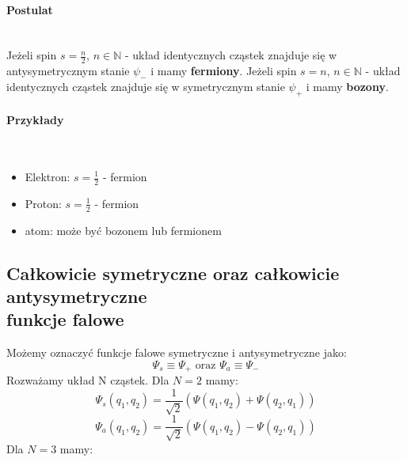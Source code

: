 \paragraph*{Postulat}\mbox{}\\
%
Jeżeli spin $s = \frac{n}{2}$, $n \in \mathbb{N}$ - układ identycznych cząstek znajduje się w antysymetrycznym stanie $\psi_-$ i mamy \textbf{fermiony}.
Jeżeli spin $s = n$, $n \in \mathbb{N}$ - układ identycznych cząstek znajduje się w symetrycznym stanie $\psi_+$ i mamy \textbf{bozony}.
%
\paragraph*{Przykłady}\mbox{}\\
\begin{itemize}
    \item Elektron: $s = \frac{1}{2}$ - fermion
    \item Proton: $s = \frac{1}{2}$ - fermion
    \item atom: może być bozonem lub fermionem
\end{itemize}
%
\subsection{Całkowicie symetryczne oraz całkowicie antysymetryczne \texorpdfstring{\\}{} funkcje falowe}
%
Możemy oznaczyć funkcje falowe symetryczne i antysymetryczne jako:
%
\begin{equation*}
    \Psi_s \equiv \Psi_+ \text{ oraz } \Psi_a \equiv \Psi_-
\end{equation*}
Rozważamy układ N cząstek.
%
Dla $N = 2$ mamy:
%
\begin{equation*}
    \Psi_s (q_1, q_2) = \frac{1}{\sqrt{2}} \left( \Psi(q_1, q_2) + \Psi(q_2, q_1) \right)
\end{equation*}
%
\begin{equation*}
    \Psi_a (q_1, q_2) = \frac{1}{\sqrt{2}} \left( \Psi(q_1, q_2) - \Psi(q_2, q_1) \right)
\end{equation*}
%
Dla $N = 3$ mamy:
%

